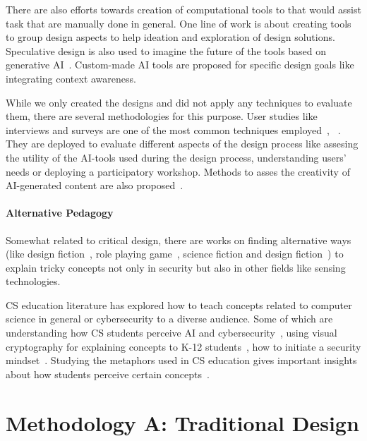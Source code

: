 There are also efforts towards creation of computational tools to that would assist task that are manually done in general. One line of work is about creating tools to group design aspects to help ideation and exploration of design solutions\cite{huang_designnet_2023}. Speculative design is also used to imagine the future of the tools based on generative AI~\cite{lin_generative_2023}. Custom-made AI tools are proposed for specific design goals like integrating context awareness\cite{fan_contextcam_2024}.

While we only created the designs and did not apply any techniques to evaluate them, there are several methodologies for this purpose. User studies like interviews and surveys are one of the most common techniques employed~\cite{sanchez_examining_2023}, ~\cite{chang_prompt_2023}. They are deployed to evaluate different aspects of the design process like assesing the utility of the AI-tools used during the design process, understanding users' needs or deploying a participatory workshop. Methods to asses the creativity of AI-generated content are also proposed~\cite{chakrabarty_art_2024}.

\paragraph{Alternative Pedagogy} 

Somewhat related to critical design, there are works on finding alternative ways (like design fiction~\cite{loureiro-koechlin_vision_2022}, role playing game~\cite{merrill_security_2020}, science fiction and design fiction~\cite{wong_real-fictional_2017}) to explain tricky concepts not only in security but also in other fields like sensing technologies.

CS education literature has explored how to teach concepts related to computer science in general or cybersecurity to a diverse audience. Some of which are understanding how CS students perceive AI and cybersecurity~\cite{ojha_computing_2023}, using visual cryptography for explaining concepts to K-12 students~\cite{rayavaram_designing_2023}, how to initiate a security mindset~\cite{holley_teaching_2023}. Studying the metaphors used in CS education gives important insights about how students perceive certain concepts~\cite{harper_conceptual_2024}.




\section{Methodology A: Traditional Design}
\label{sec:meth1}

